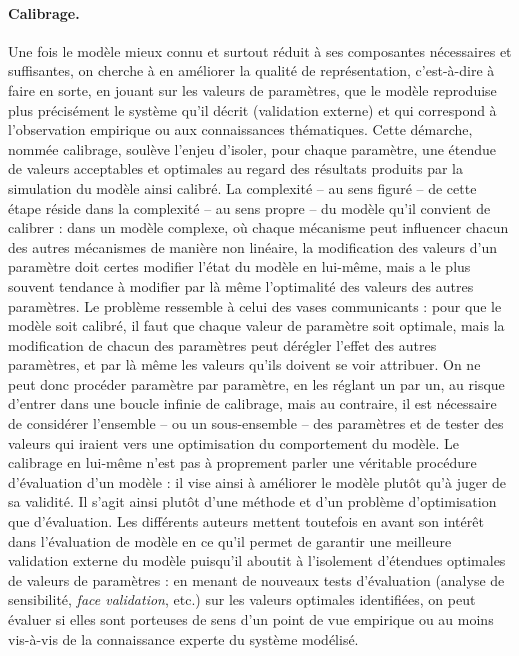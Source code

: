 \paragraph{Calibrage.}
Une fois le modèle mieux connu et surtout réduit à ses composantes nécessaires et suffisantes, on cherche à en améliorer la qualité de représentation, c'est-à-dire à faire en sorte, en jouant sur les valeurs de paramètres, que le modèle reproduise plus précisément le système qu'il décrit (validation externe) et qui correspond à l'observation empirique ou aux connaissances thématiques.
Cette démarche, nommée calibrage, soulève l'enjeu d'isoler, pour chaque paramètre, une étendue de valeurs acceptables et optimales au regard des résultats produits par la simulation du modèle ainsi calibré.
La complexité -- au sens figuré -- de cette étape réside dans la complexité -- au sens propre -- du modèle qu'il convient de calibrer :
	dans un modèle complexe, où chaque mécanisme peut influencer chacun des autres mécanismes de manière non linéaire, la modification des valeurs d'un paramètre doit certes modifier l'état du modèle en lui-même, mais a le plus souvent tendance à modifier par là même l'optimalité des valeurs des autres paramètres.
Le problème ressemble à celui des vases communicants :
	pour que le modèle soit calibré, il faut que chaque valeur de paramètre soit optimale, mais la modification de chacun des paramètres peut dérégler l'effet des autres paramètres, et par là même les valeurs qu'ils doivent se voir attribuer.
On ne peut donc procéder paramètre par paramètre, en les réglant un par un, au risque d'entrer dans une boucle infinie de calibrage, mais au contraire, il est nécessaire de considérer l'ensemble -- ou un sous-ensemble -- des paramètres et de tester des valeurs qui iraient vers une optimisation du comportement du modèle.
Le calibrage en lui-même n'est pas à proprement parler une véritable procédure d'évaluation d'un modèle :
	il vise ainsi à \og améliorer\fg{} le modèle plutôt qu'à juger de sa validité.
Il s'agit ainsi plutôt d'une méthode et d'un problème d'optimisation que d'évaluation.
Les différents auteurs mettent toutefois en avant son intérêt dans l'évaluation de modèle en ce qu'il permet de garantir une meilleure validation externe du modèle puisqu'il aboutit à l'isolement d'étendues optimales de valeurs de paramètres :
	en menant de nouveaux tests d'évaluation (analyse de sensibilité, \textit{face validation}, etc.) \autocite[43]{klugl_validation_2008} sur les valeurs optimales identifiées, on peut évaluer si elles sont porteuses de sens d'un point de vue empirique ou au moins vis-à-vis de la connaissance experte du système modélisé.


